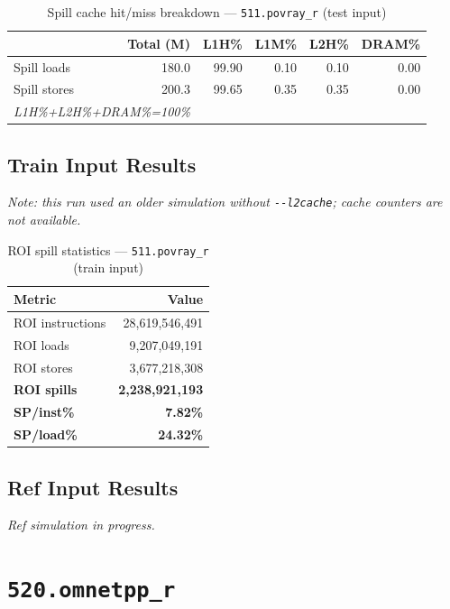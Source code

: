 \documentclass[11pt,a4paper]{article}
\begin{document}
\begin{table}[H]
\centering
\caption{Spill cache hit/miss breakdown --- \texttt{511.povray\_r} (test input)}
\label{tab:povray_test_cache}
\begin{tabular}{lrrrrr}
\toprule
\textbf{} & \textbf{Total (M)} & \textbf{L1H\%} & \textbf{L1M\%} & \textbf{L2H\%} & \textbf{DRAM\%} \\
\midrule
Spill loads  & 180.0 & 99.90 & 0.10 & 0.10 & 0.00 \\
Spill stores & 200.3 & 99.65 & 0.35 & 0.35 & 0.00 \\
\multicolumn{2}{l}{\small\textit{L1H\%+L2H\%+DRAM\%=100\%}} \\
\bottomrule
\end{tabular}
\end{table}

\subsection{Train Input Results}

\textit{Note: this run used an older simulation without \texttt{-{}-l2cache}; cache counters are not available.}


\begin{table}[H]
\centering
\caption{ROI spill statistics --- \texttt{511.povray\_r} (train input)}
\label{tab:povray_train_roi}
\begin{tabular}{lr}
\toprule
\textbf{Metric} & \textbf{Value} \\
\midrule
ROI instructions & 28,619,546,491 \\
ROI loads        & 9,207,049,191 \\
ROI stores       & 3,677,218,308 \\
\textbf{ROI spills}   & \textbf{2,238,921,193} \\
\textbf{SP/inst\%}   & \textbf{7.82\%} \\
\textbf{SP/load\%}   & \textbf{24.32\%} \\
\bottomrule
\end{tabular}
\end{table}

\subsection{Ref Input Results}
\textit{Ref simulation in progress.}



\section{\texttt{520.omnetpp\_r}}
\label{sec:omnetpp}
\end{document}
